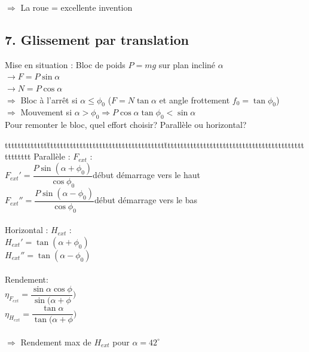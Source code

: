 $\Rightarrow$ La roue = excellente invention\\

\subsection*{7. Glissement par translation}
Mise en situation : Bloc de poids $P = mg$ sur plan incliné $\alpha$\\
$\rightarrow F = P\sin\alpha$\\
$\rightarrow N = P\cos\alpha$\\
$\Rightarrow$ Bloc à l'arrêt si $\alpha\leq\phi_0$ ($F=N\tan\alpha$ et angle frottement $f_0=\tan\phi_0$)\\ 
$\Rightarrow$ Mouvement si $\alpha>\phi_0 \Rightarrow P\cos\alpha\tan\phi_0<\sin\alpha$\\

Pour remonter le bloc, quel effort choisir? {\color{orange}Parallèle} ou {\color{orange}horizontal}?\\
\begin{bluebox}
\begin{tabbing}
ttttttttttttt\=tttttttttttttttttttttttttttttttttttt\=ttttttttttttttttttttttttttttttttttttttttttttttttttt\kill
Parallèle : $F_{ext}$ :\\
\> $F_{ext}'=\dfrac{P\sin(\alpha+\phi_0)}{\cos\phi_0}$\>début démarrage vers le haut\\
\> $F_{ext}''=\dfrac{P\sin(\alpha-\phi_0)}{\cos\phi_0}$\>début démarrage vers le bas\\\\
Horizontal : $H_{ext}$ :\\
\> $H_{ext}'=\tan(\alpha+\phi_0)$\\
\> $H_{ext}''=\tan(\alpha-\phi_0)$\\\\
Rendement:\\
\>$\eta_{F_{ext}}=\dfrac{\sin\alpha\cos\phi}{\sin(\alpha+\phi})$\\
\>$\eta_{H_{ext}}=\dfrac{\tan\alpha}{\tan(\alpha+\phi})$\\\\
\>$\Rightarrow$ Rendement max de $H_{ext}$ pour $\alpha = 42^\circ$
\end{tabbing}
\end{bluebox}\\\\

